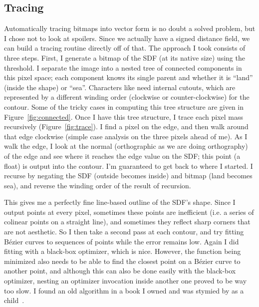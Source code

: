 \documentclass[twocolumn]{article}
\begin{document}
\subsection{Tracing}
Automatically tracing bitmaps into vector form is no doubt a solved
problem, but I chose not to look at spoilers. Since we actually have a
signed distance field, we can build a tracing routine directly off of
that. The approach I took consists of three steps. First, I generate a
bitmap of the SDF (at its native size) using the threshold. I separate
the image into a nested tree of connected components in this pixel
space; each component knows its single parent and whether it is
``land'' (inside the shape) or ``sea''. Characters like 
need internal cutouts, which are represented by a different winding
order (clockwise or counter-clockwise) for the contour. Some of the
tricky cases in computing this tree structure are given in
Figure~\ref{fig:connected}. Once I have this tree structure, I trace
each pixel mass recursively (Figure~\ref{fig:trace}). I find a pixel
on the edge, and then walk around that edge clockwise (simple case
analysis on the three pixels ahead of me). As I walk the edge, I look
at the normal (orthographic as we are doing orthography) of the edge
and see where it reaches the edge value on the SDF; this point (a
float) is output into the contour. I'm guaranteed to get back to where
I started. I recurse by negating the SDF (outside becomes inside) and
bitmap (land becomes sea), and reverse the winding order of the result
of recursion.

This gives me a perfectly fine line-based outline of the SDF's shape.
Since I output points at every pixel, sometimes these points are
inefficient (i.e. a series of colinear points on a straight line),
and sometimes they reflect sharp corners that are not aesthetic. So
I then take a second pass at each contour, and try fitting B\'ezier
curves to sequences of points while the error remains low. Again I
did fitting with a black-box optimizer, which is nice. However,
the function being minimized also needs to be able to find the
closest point on a B\'ezier curve to another point, and although
this can also be done easily with the black-box optimizer, nesting
an optimizer invocation inside another one proved to be way too slow.
I found an old algorithm in a book I owned and was stymied by as a
child~\cite{glassner1990graphics}.
\end{document}

